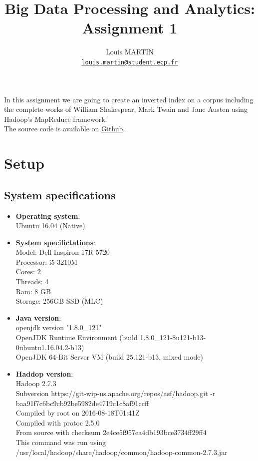 \documentclass[a4paper,10pt]{article}
\begin{document}
\title{Big Data Processing and Analytics: Assignment 1}
\author{Louis MARTIN\\
\href{mailto:louis.martin@student.ecp.fr}{\tt louis.martin@student.ecp.fr}}

\maketitle

In this assignment we are going to create an inverted index on a corpus
including the complete works of William Shakespear, Mark Twain and Jane Austen
using Hadoop's MapReduce framework.
\\The source code is available on \href{https://github.com/louismartin/bdpa}{Github}.


\section{Setup}
\subsection{System specifications}

\begin{itemize}
    \item \textbf{Operating system}:\\
    Ubuntu 16.04 (Native)
    \item \textbf{System specifictations}:\\
    Model: Dell Inspiron 17R 5720\\
    Processor: i5-3210M\\
    Cores: 2\\
    Threads: 4\\
    Ram: 8 GB\\
    Storage: 256GB SSD (MLC)
    \item \textbf{Java version}:\\
    openjdk version "1.8.0\_121"\\
    OpenJDK Runtime Environment (build 1.8.0\_121-8u121-b13-0ubuntu1.16.04.2-b13)\\
    OpenJDK 64-Bit Server VM (build 25.121-b13, mixed mode)
    \item \textbf{Haddop version}:\\
    Hadoop 2.7.3\\
    Subversion https://git-wip-us.apache.org/repos/asf/hadoop.git -r baa91f7c6bc9cb92be5982de4719c1c8af91ccff\\
    Compiled by root on 2016-08-18T01:41Z\\
    Compiled with protoc 2.5.0\\
    From source with checksum 2e4ce5f957ea4db193bce3734ff29ff4\\
    This command was run using /usr/local/hadoop/share/hadoop/common/hadoop-common-2.7.3.jar\\

\end{itemize}
\end{document}
